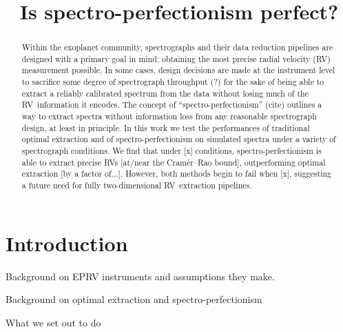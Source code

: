 \documentclass[modern]{aastex61}
\newcommand{\acronym}[1]{{\small{#1}}}
\newcommand{\RV}{\acronym{RV}}
\begin{document}
\sloppy\sloppypar\raggedbottom\frenchspacing %
\graphicspath{ {figures/} }

\title{Is spectro-perfectionism perfect?}

\begin{abstract}\noindent
Within the exoplanet community, spectrographs and their data reduction pipelines are designed with a primary goal in mind: obtaining the most precise radial velocity (\RV) measurement possible. 
In some cases, design decisions are made at the instrument level to sacrifice some degree of spectrograph throughput (?) for the sake of being able to extract a reliably calibrated spectrum from the data without losing much of the \RV\ information it encodes. 
The concept of ``spectro-perfectionism'' (cite) outlines a way to extract spectra without information loss from any reasonable spectrograph design, at least in principle. 
In this work we test the performances of traditional optimal extraction and of spectro-perfectionism on simulated spectra under a variety of spectrograph conditions. 
We find that under [x] conditions, spectro-perfectionism is able to extract precise \RV s [at/near the Cram\'er--Rao bound], outperforming optimal extraction [by a factor of...]. 
However, both methods begin to fail when [x], suggesting a future need for fully two-dimensional \RV\ extraction pipelines.
\end{abstract}

\section{Introduction}

Background on EPRV instruments and assumptions they make.

Background on optimal extraction and spectro-perfectionism

What we set out to do
\end{document}
